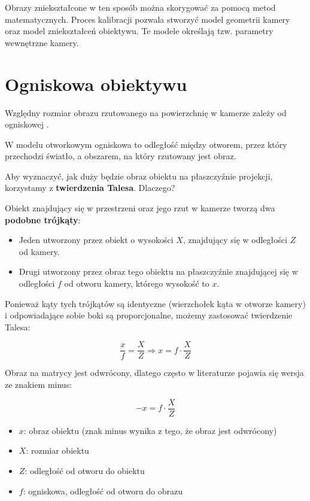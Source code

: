 \documentclass[magisterska]{pracadypl}
\begin{document}
Obrazy zniekształcone w ten sposób można skorygować za pomocą metod matematycznych. Proces kalibracji pozwala stworzyć model geometrii kamery oraz model zniekształceń obiektywu. Te modele określają tzw. parametry wewnętrzne kamery.

\section{Ogniskowa obiektywu}

Względny rozmiar obrazu rzutowanego na powierzchnię w kamerze zależy od ogniskowej \cite{ogniskowa}.

W modelu otworkowym ogniskowa to odległość między otworem, przez który przechodzi światło, a obszarem, na który rzutowany jest obraz.

Aby wyznaczyć, jak duży będzie obraz obiektu na płaszczyźnie projekcji, korzystamy z \textbf{twierdzenia Talesa}.  
Dlaczego?

Obiekt znajdujący się w przestrzeni oraz jego rzut w kamerze tworzą dwa \textbf{podobne trójkąty}:
\begin{itemize}
    \item Jeden utworzony przez obiekt o wysokości \( X \), znajdujący się w odległości \( Z \) od kamery.
    \item Drugi utworzony przez obraz tego obiektu na płaszczyźnie znajdującej się w odległości \( f \) od otworu kamery, którego wysokość to \( x \).
\end{itemize}

Ponieważ kąty tych trójkątów są identyczne (wierzchołek kąta w otworze kamery) i odpowiadające sobie boki są proporcjonalne, możemy zastosować twierdzenie Talesa:

\[
\frac{x}{f} = \frac{X}{Z} \Rightarrow x = f \cdot \frac{X}{Z}
\]

Obraz na matrycy jest odwrócony, dlatego często w literaturze pojawia się wersja ze znakiem minus:

\[
-x = f \cdot \frac{X}{Z}
\]

\begin{itemize}
  \item \textbf{$x$}: obraz obiektu (znak minus wynika z tego, że obraz jest odwrócony)
  \item \textbf{$X$}: rozmiar obiektu
  \item \textbf{$Z$}: odległość od otworu do obiektu
  \item \textbf{$f$}: ogniskowa, odległość od otworu do obrazu
\end{itemize}
\end{document}
